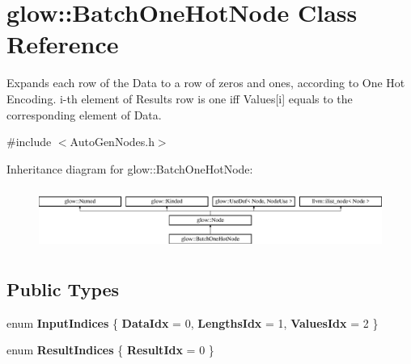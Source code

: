 \hypertarget{classglow_1_1_batch_one_hot_node}{}\section{glow\+:\+:Batch\+One\+Hot\+Node Class Reference}
\label{classglow_1_1_batch_one_hot_node}


Expands each row of the Data to a row of zeros and ones, according to One Hot Encoding. i-\/th element of Result\textquotesingle{}s row is one iff Values\mbox{[}i\mbox{]} equals to the corresponding element of Data.  




{\ttfamily \#include $<$Auto\+Gen\+Nodes.\+h$>$}

Inheritance diagram for glow\+:\+:Batch\+One\+Hot\+Node\+:\begin{figure}[H]
\begin{center}
\leavevmode
\includegraphics[height=2.028986cm]{classglow_1_1_batch_one_hot_node}
\end{center}
\end{figure}
\subsection*{Public Types}
\begin{DoxyCompactItemize}
\item 
\mbox{\label{classglow_1_1_batch_one_hot_node_aaa6a515445a5ac6c17926fb6881681f5}} 
enum {\bfseries Input\+Indices} \{ {\bfseries Data\+Idx} = 0, 
{\bfseries Lengths\+Idx} = 1, 
{\bfseries Values\+Idx} = 2
 \}
\item 
\mbox{\label{classglow_1_1_batch_one_hot_node_aee3261ff0810fb025ced783de6fff5a4}} 
enum {\bfseries Result\+Indices} \{ {\bfseries Result\+Idx} = 0
 \}
\end{DoxyCompactItemize}

